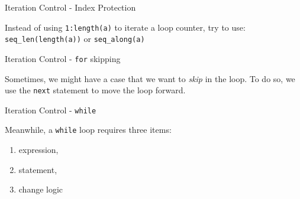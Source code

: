 \begin{frame}[fragile]{Iteration Control - Index Protection}

Instead of using \texttt{1:length(a)} to iterate a loop counter, try to
use: \texttt{seq\_len(length(a))} or \texttt{seq\_along(a)}

\begin{Shaded}
\begin{Highlighting}[]
\StringTok{ }\NormalTok{()}
\NormalTok{(}
  \NormalTok{(}\NormalTok{)}
\NormalTok{\}}

  \NormalTok{(}\NormalTok{)}
\NormalTok{\}}
\end{Highlighting}
\end{Shaded}

\end{frame}

\begin{frame}[fragile]{Iteration Control - \texttt{for} skipping}

Sometimes, we might have a case that we want to \emph{skip} in the loop.
To do so, we use the \texttt{next} statement to move the loop forward.

\begin{Shaded}
\begin{Highlighting}[]
\NormalTok{:}\NormalTok{) \{}
  \StringTok{ }\NormalTok{)\{}
  \NormalTok{\}}
  \NormalTok{)}
\NormalTok{\}}
\end{Highlighting}
\end{Shaded}

\end{frame}

\begin{frame}[fragile]{Iteration Control - \texttt{while}}

Meanwhile, a \texttt{while} loop requires three items:

\begin{enumerate}
\def\labelenumi{\arabic{enumi}.}
\tightlist
\item
  expression,
\item
  statement,
\item
  change logic
\end{enumerate}

\begin{Shaded}
\begin{Highlighting}[]
  
\NormalTok{\}}
\end{Highlighting}
\end{Shaded}

\end{frame}

